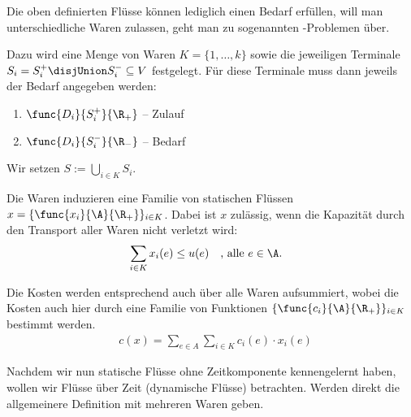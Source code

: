 \begin{definition}
    Die oben definierten Flüsse können lediglich einen Bedarf erfüllen, will
    man unterschiedliche Waren zulassen, geht man zu sogenannten
    -Problemen über.

    Dazu wird eine Menge von Waren $K = \{1, \ldots, k\}$ sowie die jeweiligen
    Terminale $S_i = S_i^+ \disjUnion S_i^- \subseteq V$ festgelegt. Für diese
    Terminale muss dann jeweils der Bedarf angegeben werden:
    \begin{enumerate}
        \item $\func{D_i}{S_i^+}{\R_+}$ -- Zulauf
        \item $\func{D_i}{S_i^-}{\R_-}$ -- Bedarf
    \end{enumerate}

    Wir setzen $S := \bigcup\limits_{i \in K} S_i$.
\end{definition}

\begin{definition}
    Die Waren induzieren eine Familie von statischen Flüssen
    $x = \{\func{x_i}{\A}{\R_+}\}_{i \in K}$. Dabei ist $x$ zulässig, wenn die
    Kapazität durch den Transport aller Waren nicht verletzt wird:
    \begin{align*}
        & \sum_{i \in K} x_i(e) \leq u(e) \quad \text{, alle } e \in \A.
    \end{align*}

    Die Kosten werden entsprechend auch über alle Waren aufsummiert,
    wobei die Kosten auch hier durch eine Familie von Funktionen
    $\{\func{c_i}{\A}{\R_+}\}_{i \in K}$ bestimmt werden.
    \begin{align*}
        & c(x) = \sum_{e \in A} \sum_{i \in K} c_i(e) \cdot x_i(e)
    \end{align*}
\end{definition}

Nachdem wir nun statische Flüsse ohne Zeitkomponente kennengelernt haben,
wollen wir Flüsse über Zeit (dynamische Flüsse) betrachten. Werden direkt
die allgemeinere Definition mit mehreren Waren geben.

